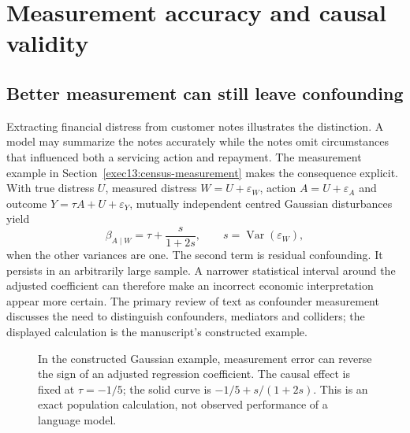 \section{Measurement accuracy and causal validity}
\label{reading:assistance-conclusions}

\subsection{Better measurement can still leave confounding}

Extracting financial distress from customer notes illustrates the distinction.
A model may summarize the notes accurately while the notes omit circumstances
that influenced both a servicing action and repayment. The measurement example
in Section~\ref{exec13:census-measurement} makes the consequence explicit.
With true distress $U$, measured distress $W=U+\varepsilon_W$, action
$A=U+\varepsilon_A$ and outcome $Y=\tau A+U+\varepsilon_Y$, mutually
independent centred Gaussian disturbances yield
\[
 \beta_{A\mid W}=\tau+\frac{s}{1+2s},\qquad
 s=\operatorname{Var}(\varepsilon_W),
\]
when the other variances are one. The second term is residual confounding.
It persists in an arbitrarily large sample. A narrower statistical interval
around the adjusted coefficient can therefore make an incorrect economic
interpretation appear more certain. The primary review of text as confounder
measurement discusses the need to distinguish confounders, mediators and
colliders; the displayed calculation is the manuscript's constructed example.
\citep{exec13_census_text_review_arxiv}

\begin{figure}[htbp]\centering
{}
\caption{In the constructed Gaussian example, measurement error can reverse
the sign of an adjusted regression coefficient. The causal effect is fixed at
$\tau=-1/5$; the solid curve is $-1/5+s/(1+2s)$. This is an exact population
calculation, not observed performance of a language model.}
\label{reading:measurement-error}
\end{figure}

